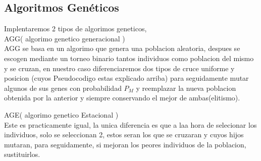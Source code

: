 \newpage
\subsection{Algoritmos Genéticos}

Implentaremos 2 tipos de algorimos geneticos,\\
AGG( algorimo genetico generacional )\\
AGG se basa en un algorimo que genera una poblacion aleatoria, despues se escogen mediante un torneo binario tantos individuos como
poblacion del mismo y se cruzan, en nuestro caso diferenciaremos dos tipos de cruce uniforme y posicion (cuyos Pseudocodigo estas explicado arriba)
para seguidamente mutar algunos de sus genes con probabilidad $P_M$ y reemplazar la nueva poblacion obtenida por la anterior y siempre conservando el mejor de ambas(elitismo).\\\newline 

AGE( algorimo genetico Estacional )\\  
Este es practicamente igual, la unica diferencia es que a laa hora de selecionar los individuos, solo se seleccionan 2, estos seran los que se cruzaran y cuyos hijos mutaran, 
para seguidamente, si mejoran los peores individuos de la poblacion, sustituirlos.


